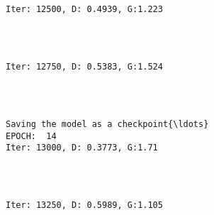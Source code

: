 \documentclass[11pt]{article}
\begin{document}
    \begin{center}
    \end{center}
    { \hspace*{\fill} \\}
    
    \begin{Verbatim}[commandchars=\\\{\}]

Iter: 12500, D: 0.4939, G:1.223
    \end{Verbatim}

    \begin{center}
    \end{center}
    { \hspace*{\fill} \\}
    
    \begin{Verbatim}[commandchars=\\\{\}]

Iter: 12750, D: 0.5383, G:1.524
    \end{Verbatim}

    \begin{center}
    \end{center}
    { \hspace*{\fill} \\}
    
    \begin{Verbatim}[commandchars=\\\{\}]

Saving the model as a checkpoint{\ldots}
EPOCH:  14
Iter: 13000, D: 0.3773, G:1.71
    \end{Verbatim}

    \begin{center}
    \end{center}
    { \hspace*{\fill} \\}
    
    \begin{Verbatim}[commandchars=\\\{\}]

Iter: 13250, D: 0.5989, G:1.105
    \end{Verbatim}
\end{document}

